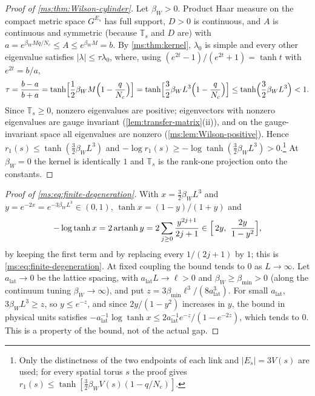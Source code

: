 \documentclass[11pt,a4paper]{amsart}
\theoremstyle{definition}
\theoremstyle{remark}
\numberwithin{equation}{section}
\newcommand{\abs}[1]{\lvert #1\rvert}      %
\newcommand{\TT}{\mathbb{T}}               %
\newcommand{\Vol}[1]{V(#1)}                %
\newcommand{\lzero}{\lambda_0}             %
\newcommand{\betaW}{\beta_{W}}             %
\begin{document}
\begin{proof}[Proof of \cref{ms:thm:Wilson-cylinder}]
Let $\betaW>0$. Product Haar measure on the compact metric space $G^{E_s}$ has full support, $D>0$ is continuous, and $A$ is continuous and symmetric (because $\TT_s$ and $D$ are) with $a=e^{\betaW Mq/N_c}\le A\le e^{\betaW M}=b$. By \cref{ms:thm:kernel}, $\lzero$ is simple and every other eigenvalue satisfies $\abs\lambda\le\tau\lzero$, where, using $(e^{2t}-1)/(e^{2t}+1)=\tanh t$ with $e^{2t}=b/a$,
\[
\tau=\frac{b-a}{b+a}=\tanh\Bigl[\frac12\betaW M\Bigl(1-\frac q{N_c}\Bigr)\Bigr]=\tanh\Bigl[\frac32\betaW L^3\Bigl(1-\frac q{N_c}\Bigr)\Bigr]\le\tanh\Bigl(\frac32\betaW L^3\Bigr)<1 .
\]
Since $\TT_s\ge0$, nonzero eigenvalues are positive; eigenvectors with nonzero eigenvalues are gauge invariant (\cref{lem:transfer-matrix}(ii)), and on the gauge-invariant space all eigenvalues are nonzero (\cref{ms:lem:Wilson-positive}). Hence $r_1(s)\le\tanh(\frac32\betaW L^3)$ and $-\log r_1(s)\ge-\log\tanh(\frac32\betaW L^3)>0$.\footnote{Only the distinctness of the two endpoints of each link and $\abs{E_s}=3\Vol{s}$ are used; for every spatial torus $s$ the proof gives $r_1(s)\le\tanh[\frac32\betaW\Vol{s}(1-q/N_c)]$.} At $\betaW=0$ the kernel is identically $1$ and $\TT_s$ is the rank-one projection onto the constants.
\end{proof}

\begin{proof}[Proof of \eqref{ms:eq:finite-degeneration}]
With $x=\frac32\betaW L^3$ and $y=e^{-2x}=e^{-3\betaW L^3}\in(0,1)$, $\tanh x=(1-y)/(1+y)$ and
\[
-\log\tanh x=2\operatorname{artanh}y=2\sum_{j\ge0}\frac{y^{2j+1}}{2j+1}\in\Bigl[\,2y,\ \frac{2y}{1-y^2}\Bigr],
\]
by keeping the first term and by replacing every $1/(2j+1)$ by $1$; this is \eqref{ms:eq:finite-degeneration}. At fixed coupling the bound tends to $0$ as $L\to\infty$. Let $a_{\mathrm{lat}}\to0$ be the lattice spacing, with $a_{\mathrm{lat}}L\to\ell>0$ and $\betaW\ge\beta_{\min}>0$ (along the continuum tuning $\betaW\to\infty$), and put $z=3\beta_{\min}\ell^3/(8a_{\mathrm{lat}}^3)$. For small $a_{\mathrm{lat}}$, $3\betaW L^3\ge z$, so $y\le e^{-z}$, and since $2y/(1-y^2)$ increases in $y$, the bound in physical units satisfies $-a_{\mathrm{lat}}^{-1}\log\tanh x\le2a_{\mathrm{lat}}^{-1}e^{-z}/(1-e^{-2z})$, which tends to $0$. This is a property of the bound, not of the actual gap.
\end{proof}
\end{document}
